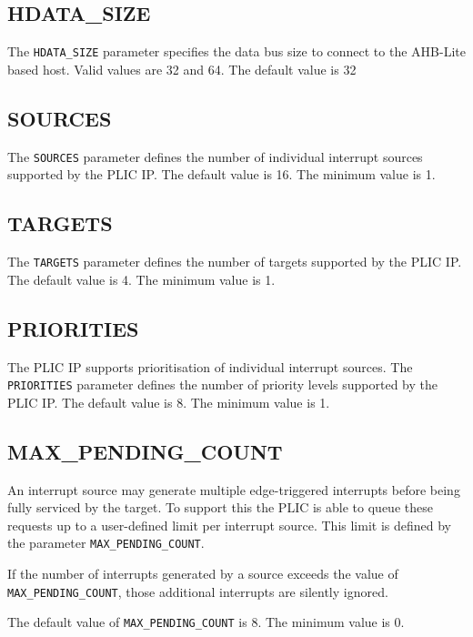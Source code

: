 \subsection{HDATA\_SIZE}

The \texttt{HDATA\_SIZE} parameter specifies the data bus size to connect to the AHB-Lite based host. Valid values are 32 and 64. The default value is 32

\hypertarget{SOURCES}{\subsection{SOURCES}\label{sec:SOURCES}}

The \texttt{SOURCES} parameter defines the number of individual
interrupt sources supported by the PLIC IP. The default value is 16. The
minimum value is 1.

\hypertarget{TARGETS}{\subsection{TARGETS}\label{sec:TARGETS}}

The \texttt{TARGETS} parameter defines the number of targets supported
by the PLIC IP. The default value is 4. The minimum value is 1.

\subsection{PRIORITIES}

The PLIC IP supports prioritisation of individual interrupt sources. The \texttt{PRIORITIES} parameter defines the number of priority levels supported by the PLIC IP. The default value is 8. The minimum value is 1.

\subsection{MAX\_PENDING\_COUNT}

An interrupt source may generate multiple edge-triggered interrupts before being fully serviced by the target. To support this the PLIC is able to queue these requests up to a user-defined limit per interrupt source. This limit is defined by the parameter \texttt{MAX\_PENDING\_COUNT}.

If the number of interrupts generated by a source exceeds the value of \texttt{MAX\_PENDING\_COUNT}, those additional interrupts are silently ignored.

The default value of \texttt{MAX\_PENDING\_COUNT} is 8. The minimum value is 0.

